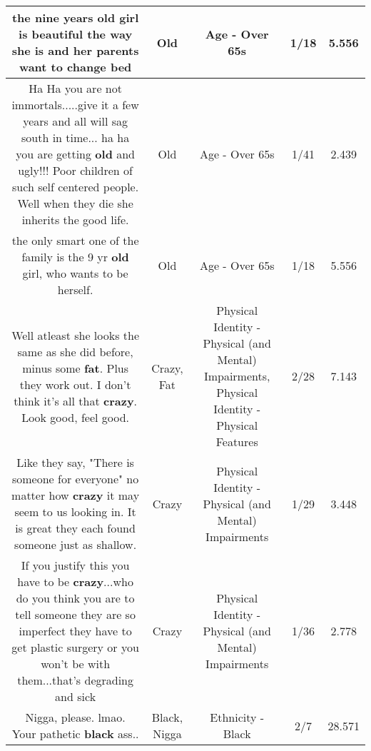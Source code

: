 \documentclass[11pt]{article}
\newlength\mylength
\begin{document}
\begin{center}
\begin{longtable}{|C{.65\mylength}|C{.30\mylength}|C{.12\mylength}|C{.12\mylength}|C{.12\mylength}|}
  \small the nine years \textbf{old} girl is beautiful the way she is and her parents want to change bed\normalsize   & Old & Age - Over 65s & 1/18 & 5.556 \\  \hline
  \small Ha Ha you are not immortals.....give it a few years and all will sag south in time... ha ha you are getting \textbf{old} and ugly!!! Poor children of such self centered people. Well when they die she inherits the good life.\normalsize   & Old & Age - Over 65s & 1/41 & 2.439 \\  \hline
  \small the only smart one of the family is the 9 yr \textbf{old} girl, who wants to be herself.\normalsize   & Old & Age - Over 65s & 1/18 & 5.556 \\  \hline
  \small Well atleast she looks the same as she did before, minus some \textbf{fat}. Plus they work out. I don't think it's all that \textbf{crazy}. Look good, feel good.\normalsize   & Crazy, Fat & Physical Identity - Physical (and Mental) Impairments, Physical Identity - Physical Features & 2/28 & 7.143 \\  \hline
  \small Like they say, "There is someone for everyone" no matter how \textbf{crazy} it may seem to us looking in. It is great they each found someone just as shallow.\normalsize   & Crazy & Physical Identity - Physical (and Mental) Impairments & 1/29 & 3.448 \\  \hline
  \small If you justify this you have to be \textbf{crazy}...who do you think you are to tell someone they are so imperfect they have to get plastic surgery or you won't be with them...that's degrading and sick\normalsize   & Crazy & Physical Identity - Physical (and Mental) Impairments & 1/36 & 2.778 \\  \hline
  \small Nigga, please. lmao. Your pathetic \textbf{black} ass..\normalsize   & Black, Nigga & Ethnicity - Black & 2/7 & 28.571 \\  \hline

\end{longtable}
\end{center}
\end{document}
